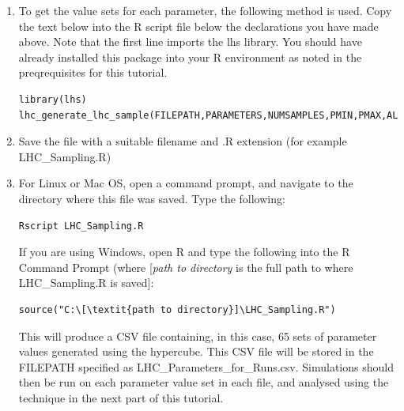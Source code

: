 \documentclass[a4paper,11pt]{article}
\begin{document}
\begin{enumerate}
\item To get the value sets for each parameter, the following method is used.  Copy the text below into the R script file below the declarations you have made above. Note that the first line imports the lhs library. You should have already installed this package into your R environment as noted in the preqrequisites for this tutorial.

\begin{verbatim}
library(lhs)
lhc_generate_lhc_sample(FILEPATH,PARAMETERS,NUMSAMPLES,PMIN,PMAX,ALGORITHM)
\end{verbatim}

\item Save the file with a suitable filename and .R extension (for example LHC\_Sampling.R)
\item For Linux or Mac OS, open a command prompt, and navigate to the directory where this file was saved.  Type the following:

\begin{verbatim}
Rscript LHC_Sampling.R
\end{verbatim}

If you are using Windows, open R and type the following into the R Command Prompt (where [\textit{path to directory} is the full path to where LHC\_Sampling.R is saved]:

\begin{verbatim}
source("C:\[\textit{path to directory}]\LHC_Sampling.R")
\end{verbatim}

This will produce a CSV file containing, in this case, 65 sets of parameter values generated using the hypercube. This CSV file will be stored in the FILEPATH specified as LHC\_Parameters\_for\_Runs.csv. Simulations should then be run on each parameter value set in each file, and analysed using the technique in the next part of this tutorial.

\end{enumerate}
\end{document}
